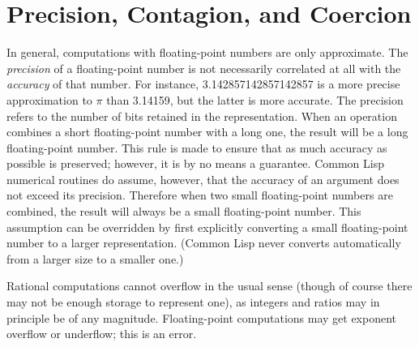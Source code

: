 \section{Precision, Contagion, and Coercion}
\label{PRECISION-CONTAGION-COERCION-SECTION}

In general,
computations with floating-point numbers are only approximate.
The \emph{precision} of a floating-point number is not necessarily
correlated at all with the \emph{accuracy} of that number.
For instance, 3.142857142857142857 is a more precise approximation
to $\pi$ than 3.14159, but the latter is more accurate.
The precision refers to the number of bits retained in the representation.
When an operation combines a short floating-point number with a long one,
the result will be a long floating-point number.  This rule is made
to ensure that as much accuracy as possible is preserved; however,
it is by no means a guarantee.
Common Lisp numerical routines do assume, however, that the accuracy of
an argument does not exceed its precision.  Therefore
when two small floating-point numbers
are combined, the result will always be a small floating-point number.
This assumption can be overridden by first explicitly converting
a small floating-point number to a larger representation.
(Common Lisp never converts automatically from a larger size to a smaller one.)

Rational computations cannot overflow in the usual sense
(though of course there may not be enough storage
to represent one), as integers and ratios may in principle be of any magnitude.
Floating-point computations may get exponent overflow or underflow;
this is an error.


